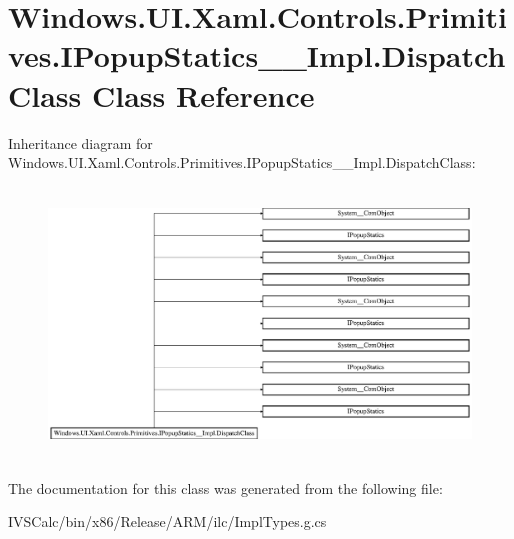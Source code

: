 \hypertarget{class_windows_1_1_u_i_1_1_xaml_1_1_controls_1_1_primitives_1_1_i_popup_statics_____impl_1_1_dispatch_class}{}\section{Windows.\+U\+I.\+Xaml.\+Controls.\+Primitives.\+I\+Popup\+Statics\+\_\+\+\_\+\+Impl.\+Dispatch\+Class Class Reference}
\label{class_windows_1_1_u_i_1_1_xaml_1_1_controls_1_1_primitives_1_1_i_popup_statics_____impl_1_1_dispatch_class}
Inheritance diagram for Windows.\+U\+I.\+Xaml.\+Controls.\+Primitives.\+I\+Popup\+Statics\+\_\+\+\_\+\+Impl.\+Dispatch\+Class\+:\begin{figure}[H]
\begin{center}
\leavevmode
\includegraphics[height=7.230048cm]{class_windows_1_1_u_i_1_1_xaml_1_1_controls_1_1_primitives_1_1_i_popup_statics_____impl_1_1_dispatch_class}
\end{center}
\end{figure}


The documentation for this class was generated from the following file\+:\begin{DoxyCompactItemize}
\item 
I\+V\+S\+Calc/bin/x86/\+Release/\+A\+R\+M/ilc/Impl\+Types.\+g.\+cs\end{DoxyCompactItemize}
